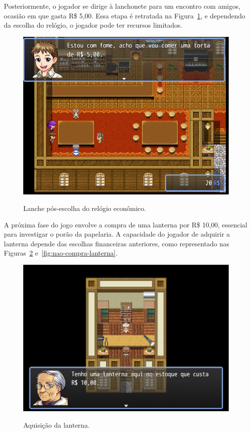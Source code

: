 Posteriormente, o jogador se dirige à lanchonete para um encontro com amigos, ocasião em que gasta R\$ 5,00. Essa etapa é retratada na Figura~\ref{fig:lanchonete-pos-relogio}, e dependendo da escolha do relógio, o jogador pode ter recursos limitados.%

\begin{figure}[!htbp]
	\centering
	\caption{Lanche pós-escolha do relógio econômico.}
	\includegraphics[scale=0.5]{Textuais/Pictures/lanchonete-pos-relogio.png}
	\label{fig:lanchonete-pos-relogio}
\end{figure}

A próxima fase do jogo envolve a compra de uma lanterna por R\$ 10,00, essencial para investigar o porão da papelaria. A capacidade do jogador de adquirir a lanterna depende das escolhas financeiras anteriores, como representado nas Figuras~\ref{fig:compra-lanterna} e~\ref{fig:nao-compra-lanterna}.

\begin{figure}[!htbp]
	\centering
	\caption{Aquisição da lanterna.}
	\includegraphics[scale=0.5]{Textuais/Pictures/compra-lanterna.png}
	\label{fig:compra-lanterna}
\end{figure}

